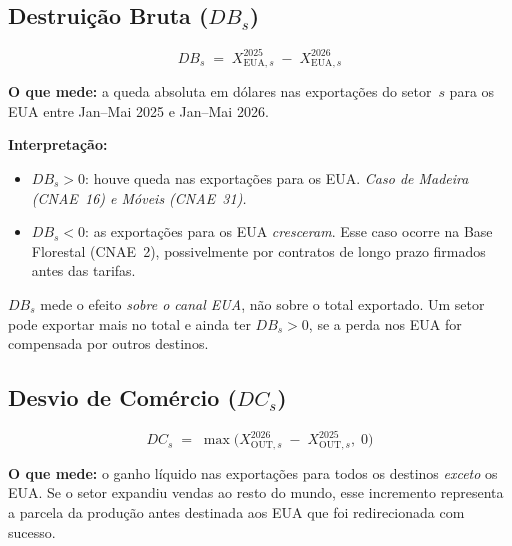 \documentclass[12pt, a4paper]{article}
\begin{document}
\subsection{Destruição Bruta (\texorpdfstring{$DB_s$}{DB})}

\begin{formulabox}
\begin{equation}
  DB_s \;=\; X_{\text{EUA},s}^{2025} \;-\; X_{\text{EUA},s}^{2026}
  \label{eq:db}
\end{equation}
\end{formulabox}

\noindent\textbf{O que mede:} a queda absoluta em dólares nas exportações do
setor~$s$ para os EUA entre Jan--Mai 2025 e Jan--Mai 2026.

\noindent\textbf{Interpretação:}
\begin{itemize}[noitemsep]
  \item $DB_s > 0$: houve queda nas exportações para os EUA.
    \textit{Caso de Madeira (CNAE~16) e Móveis (CNAE~31).}
  \item $DB_s < 0$: as exportações para os EUA \emph{cresceram}.
    Esse caso ocorre na Base Florestal (CNAE~2), possivelmente por
    contratos de longo prazo firmados antes das tarifas.
\end{itemize}

\begin{atencaobox}
$DB_s$ mede o efeito \emph{sobre o canal EUA}, não sobre o total exportado.
Um setor pode exportar mais no total e ainda ter $DB_s > 0$, se a perda
nos EUA for compensada por outros destinos.
\end{atencaobox}

\subsection{Desvio de Comércio (\texorpdfstring{$DC_s$}{DC})}

\begin{formulabox}
\begin{equation}
  DC_s \;=\; \max\!\bigl(X_{\text{OUT},s}^{2026} \;-\; X_{\text{OUT},s}^{2025},\; 0\bigr)
  \label{eq:dc}
\end{equation}
\end{formulabox}

\noindent\textbf{O que mede:} o ganho líquido nas exportações para todos os
destinos \emph{exceto} os EUA. Se o setor expandiu vendas ao resto do mundo,
esse incremento representa a parcela da produção antes destinada aos EUA
que foi redirecionada com sucesso.
\end{document}
